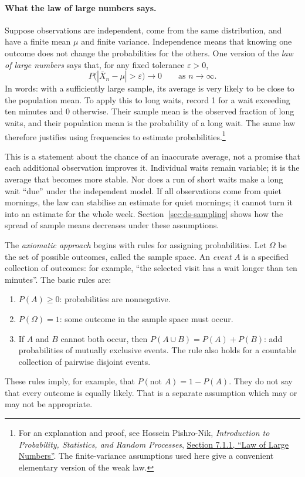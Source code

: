 \paragraph{What the law of large numbers says.}
Suppose observations are independent, come from the same distribution,
and have a finite mean $\mu$ and finite variance. Independence means that
knowing one outcome does not change the probabilities for the others.
One version of the \emph{law of large numbers} says that, for any fixed
tolerance $\varepsilon>0$,
\[
 P\bigl(|\bar X_n-\mu|>\varepsilon\bigr)\longrightarrow0
 \qquad\text{as }n\longrightarrow\infty.
\]
In words: with a sufficiently large sample, its average is very likely
to be close to the population mean. To apply this to long waits, record
1 for a wait exceeding ten minutes and 0 otherwise. Their sample mean
is the observed fraction of long waits, and their population mean is
the probability of a long wait. The same law therefore justifies using
frequencies to estimate probabilities.\footnote{For an explanation and
proof, see Hossein Pishro-Nik, \emph{Introduction to Probability, Statistics,
and Random Processes},
\href{https://www.probabilitycourse.com/chapter7/7_1_1_law_of_large_numbers.php}
{Section 7.1.1, ``Law of Large Numbers''}. The finite-variance assumptions
used here give a convenient elementary version of the weak law.}

This is a statement about the chance of an inaccurate average, not a
promise that each additional observation improves it. Individual waits
remain variable; it is the average that becomes more stable. Nor does
a run of short waits make a long wait ``due'' under the independent model.
If all observations come from quiet mornings, the law can stabilise an
estimate for quiet mornings; it cannot turn it into an estimate for the
whole week. Section~\ref{sec:ds-sampling} shows how the spread of sample
means decreases under these assumptions.

The \emph{axiomatic approach} begins with rules for assigning probabilities.
Let $\Omega$ be the set of possible outcomes, called the sample space.
An \emph{event} $A$ is a specified collection of outcomes: for example,
``the selected visit has a wait longer than ten minutes''. The basic rules
are:
\begin{enumerate}
\item $P(A)\geq0$: probabilities are nonnegative.
\item $P(\Omega)=1$: some outcome in the sample space must occur.
\item If $A$ and $B$ cannot both occur, then
$P(A\cup B)=P(A)+P(B)$: add probabilities of mutually exclusive events.
The rule also holds for a countable collection of pairwise disjoint events.
\end{enumerate}
These rules imply, for example, that $P(\text{not }A)=1-P(A)$.
They do not say that every outcome is equally likely. That is a separate
assumption which may or may not be appropriate.

